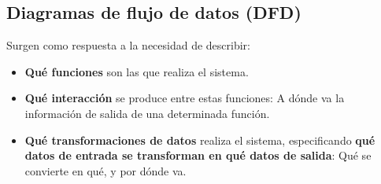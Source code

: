 \begin{table}[ht]
    \centering
    \caption{Diferentes técnicas de especificación}
\end{table}


\subsection{Diagramas de flujo de datos (DFD)}

Surgen como respuesta a la necesidad de describir:

\begin{itemize}
    \item \textbf{Qué funciones} son las que realiza el sistema.
    \item \textbf{Qué interacción} se produce entre estas funciones: A dónde va la información de salida de una determinada función.
    \item \textbf{Qué transformaciones de datos} realiza el sistema, especificando \textbf{qué datos de entrada se transforman en qué datos de salida}: Qué se convierte en qué, y por dónde va.
\end{itemize}

